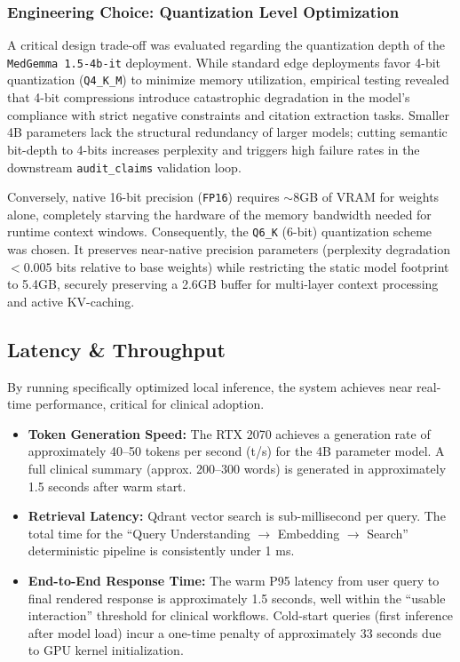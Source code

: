 \subsubsection{Engineering Choice: Quantization Level Optimization}
A critical design trade-off was evaluated regarding the quantization depth of the \texttt{MedGemma 1.5-4b-it} deployment. While standard edge deployments favor 4-bit quantization (\texttt{Q4\_K\_M}) to minimize memory utilization, empirical testing revealed that 4-bit compressions introduce catastrophic degradation in the model's compliance with strict negative constraints and citation extraction tasks. Smaller 4B parameters lack the structural redundancy of larger models; cutting semantic bit-depth to 4-bits increases perplexity and triggers high failure rates in the downstream \texttt{audit\_claims} validation loop.

Conversely, native 16-bit precision (\texttt{FP16}) requires $\sim$8GB of VRAM for weights alone, completely starving the hardware of the memory bandwidth needed for runtime context windows. Consequently, the \texttt{Q6\_K} (6-bit) quantization scheme was chosen. It preserves near-native precision parameters (perplexity degradation $< 0.005$ bits relative to base weights) while restricting the static model footprint to 5.4GB, securely preserving a 2.6GB buffer for multi-layer context processing and active KV-caching.

\subsection{Latency \& Throughput}
By running specifically optimized local inference, the system achieves near real-time performance, critical for clinical adoption.

\begin{itemize}
    \item \textbf{Token Generation Speed:} The RTX 2070 achieves a generation rate of approximately 40--50 tokens per second (t/s) for the 4B parameter model. A full clinical summary (approx. 200--300 words) is generated in approximately 1.5 seconds after warm start.
    \item \textbf{Retrieval Latency:} Qdrant vector search is sub-millisecond per query. The total time for the ``Query Understanding $\rightarrow$ Embedding $\rightarrow$ Search'' deterministic pipeline is consistently under 1 ms.
    \item \textbf{End-to-End Response Time:} The warm P95 latency from user query to final rendered response is approximately 1.5 seconds, well within the ``usable interaction'' threshold for clinical workflows. Cold-start queries (first inference after model load) incur a one-time penalty of approximately 33 seconds due to GPU kernel initialization.
\end{itemize}

